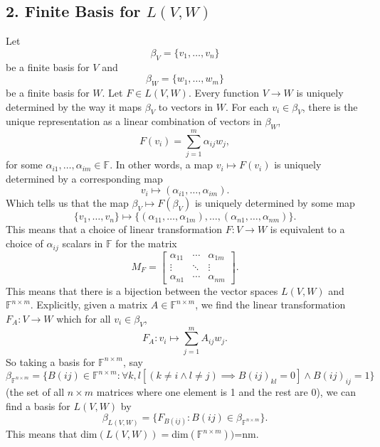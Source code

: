 \documentclass[12pt]{article}
\newcommand{\F}{\mathbb{F}}
\begin{document}
\subsection*{2. Finite Basis for $L(V,W)$}
Let
\[\beta_V = \{v_1, \dots, v_n\}\]
be a finite basis for $V$ and
\[\beta_W = \{w_1, \dots, w_m\}\]
be a finite basis for $W$. Let $F\in L(V,W)$. Every function $V\rightarrow W$ is uniquely determined by the way it maps $\beta_V$ to vectors in $W$. For each $v_i\in\beta_V$, there is the unique representation as a linear combination of vectors in $\beta_W$,
\[F(v_i) = \sum_{j=1}^m\alpha_{ij}w_j,\]
for some $\alpha_{i1},\dots,\alpha_{im}\in\F$. In other words, a map $v_i\mapsto F(v_i)$ is uniquely determined by a corresponding map
\[v_i\mapsto(\alpha_{i1},\dots,\alpha_{im}).\]
Which tells us that the map $\beta_V\mapsto F(\beta_V)$ is uniquely determined by some map
\[\{v_1, \dots, v_n\} \mapsto \{(\alpha_{11},\dots,\alpha_{1m}),\dots,(\alpha_{n1},\dots,\alpha_{nm})\}.\]
This means that a choice of linear transformation $F:V\rightarrow W$ is equivalent to a choice of $\alpha_{ij}$ scalars in $\F$ for the matrix
\[M_F = \begin{bmatrix}
    \alpha_{11} & \cdots & \alpha_{1m} \\
    \vdots & \ddots & \vdots \\
    \alpha_{n1} & \cdots & \alpha_{nm}
\end{bmatrix}.\]
This means that there is a bijection between the vector spaces $L(V,W)$ and $\F^{n\times m}$. Explicitly, given a matrix $A\in\F^{n\times m}$, we find the linear transformation $F_A:V\rightarrow W$ which for all $v_i\in\beta_V$,
\[F_A: v_i \mapsto \sum_{j=1}^mA_{ij}w_j.\]
So taking a basis for $\F^{n\times m}$, say
\[\beta_{\F^{n\times m}}=\{B(ij)\in\F^{n\times m}: \forall k,l[(k\ne i \land l\ne j) \implies B(ij)_{kl}=0] \land B(ij)_{ij}=1\}\]
(the set of all $n\times m$ matrices where one element is 1 and the rest are 0), we can find a basis for $L(V,W)$ by
\[\beta_{L(V,W)} = \{F_{B(ij)}: B(ij)\in\beta_{\F^{n\times m}}\}.\]
This means that dim$(L(V,W))=$dim$(\F^{n\times m}))$=nm.
\end{document}
